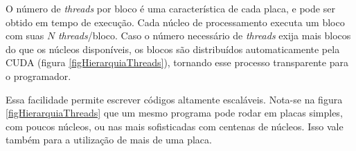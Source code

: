 	O número de \textit{threads} por bloco é uma característica de cada placa, e pode ser obtido em tempo de execução. Cada núcleo de processamento executa um bloco com suas $N$ \textit{threads}/bloco. Caso o número necessário de \textit{threads} exija mais blocos do que os núcleos disponíveis, os blocos são distribuídos automaticamente pela CUDA (figura \ref{figHierarquiaThreads}), tornando esse processo transparente para o programador.
	
	Essa facilidade permite escrever códigos altamente escaláveis. Nota-se na figura \ref{figHierarquiaThreads} que um mesmo programa pode rodar em placas simples, com poucos núcleos, ou nas mais sofisticadas com centenas de núcleos. Isso vale também para a utilização de mais de uma placa.